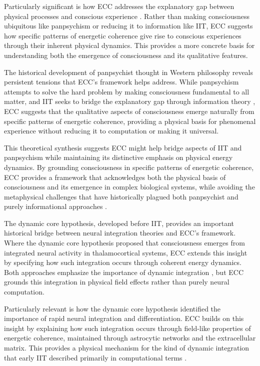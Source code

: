 Particularly significant is how ECC addresses the explanatory gap between physical processes and conscious experience \cite{Koch2019}. Rather than making consciousness ubiquitous like panpsychism or reducing it to information like IIT, ECC suggests how specific patterns of energetic coherence give rise to conscious experiences through their inherent physical dynamics. This provides a more concrete basis for understanding both the emergence of consciousness and its qualitative features.

The historical development of panpsychist thought in Western philosophy \cite{Skrbina2017} reveals persistent tensions that ECC's framework helps address. While panpsychism attempts to solve the hard problem by making consciousness fundamental to all matter, and IIT seeks to bridge the explanatory gap through information theory \cite{Tononi2015}, ECC suggests that the qualitative aspects of consciousness emerge naturally from specific patterns of energetic coherence, providing a physical basis for phenomenal experience without reducing it to computation or making it universal.

This theoretical synthesis suggests ECC might help bridge aspects of IIT and panpsychism while maintaining its distinctive emphasis on physical energy dynamics. By grounding consciousness in specific patterns of energetic coherence, ECC provides a framework that acknowledges both the physical basis of consciousness and its emergence in complex biological systems, while avoiding the metaphysical challenges that have historically plagued both panpsychist and purely informational approaches \cite{Shani2015}.

The dynamic core hypothesis, developed before IIT, provides an important historical bridge between neural integration theories and ECC's framework. Where the dynamic core hypothesis proposed that consciousness emerges from integrated neural activity in thalamocortical systems, ECC extends this insight by specifying how such integration occurs through coherent energy dynamics. Both approaches emphasize the importance of dynamic integration \cite{Tononi2008}, but ECC grounds this integration in physical field effects rather than purely neural computation.

Particularly relevant is how the dynamic core hypothesis identified the importance of rapid neural integration and differentiation. ECC builds on this insight by explaining how such integration occurs through field-like properties of energetic coherence, maintained through astrocytic networks and the extracellular matrix. This provides a physical mechanism for the kind of dynamic integration that early IIT described primarily in computational terms \cite{Oizumi2014}.

